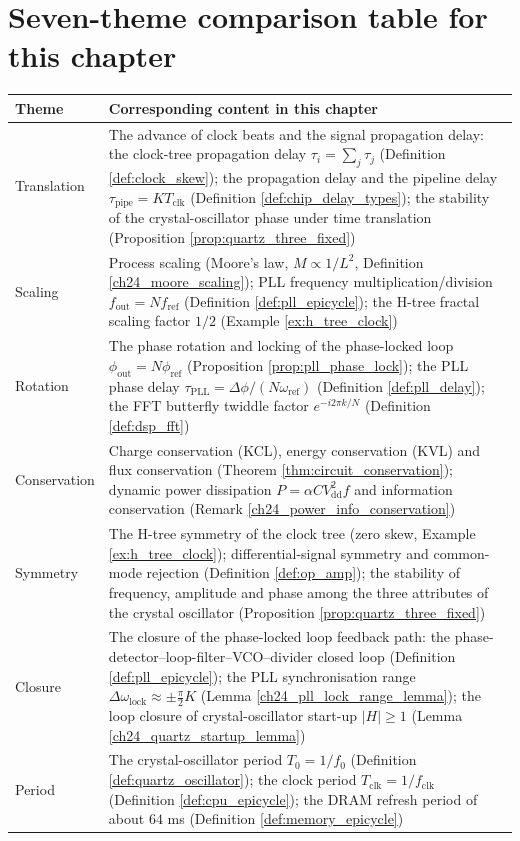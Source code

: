 \section*{Seven-theme comparison table for this chapter}

\begin{center}
\begin{tabular}{>{\centering\arraybackslash}p{2.8cm}>{\centering\arraybackslash}p{9.9cm}}
\toprule
Theme & Corresponding content in this chapter \\
\midrule
Translation & The advance of clock beats and the signal propagation delay: the clock-tree propagation delay $\tau_i = \sum_{j}\tau_j$ (Definition \ref{def:clock_skew}); the propagation delay and the pipeline delay $\tau_{\text{pipe}} = K T_{\text{clk}}$ (Definition \ref{def:chip_delay_types}); the stability of the crystal-oscillator phase under time translation (Proposition \ref{prop:quartz_three_fixed}) \\
Scaling & Process scaling (Moore's law, $M\propto 1/L^2$, Definition \ref{ch24_moore_scaling}); PLL frequency multiplication/division $f_{\text{out}} = N f_{\text{ref}}$ (Definition \ref{def:pll_epicycle}); the H-tree fractal scaling factor $1/2$ (Example \ref{ex:h_tree_clock}) \\
Rotation & The phase rotation and locking of the phase-locked loop $\phi_{\text{out}} = N\phi_{\text{ref}}$ (Proposition \ref{prop:pll_phase_lock}); the PLL phase delay $\tau_{\text{PLL}} = \Delta\phi/(N\omega_{\text{ref}})$ (Definition \ref{def:pll_delay}); the FFT butterfly twiddle factor $e^{-i2\pi k/N}$ (Definition \ref{def:dsp_fft}) \\
Conservation & Charge conservation (KCL), energy conservation (KVL) and flux conservation (Theorem \ref{thm:circuit_conservation}); dynamic power dissipation $P = \alpha C V_{\text{dd}}^2 f$ and information conservation (Remark \ref{ch24_power_info_conservation}) \\
Symmetry & The H-tree symmetry of the clock tree (zero skew, Example \ref{ex:h_tree_clock}); differential-signal symmetry and common-mode rejection (Definition \ref{def:op_amp}); the stability of frequency, amplitude and phase among the three attributes of the crystal oscillator (Proposition \ref{prop:quartz_three_fixed}) \\
Closure & The closure of the phase-locked loop feedback path: the phase-detector--loop-filter--VCO--divider closed loop (Definition \ref{def:pll_epicycle}); the PLL synchronisation range $\Delta\omega_{\text{lock}} \approx \pm\frac{\pi}{2}K$ (Lemma \ref{ch24_pll_lock_range_lemma}); the loop closure of crystal-oscillator start-up $|H|\ge 1$ (Lemma \ref{ch24_quartz_startup_lemma}) \\
Period & The crystal-oscillator period $T_0 = 1/f_0$ (Definition \ref{def:quartz_oscillator}); the clock period $T_{\text{clk}} = 1/f_{\text{clk}}$ (Definition \ref{def:cpu_epicycle}); the DRAM refresh period of about $64$ ms (Definition \ref{def:memory_epicycle}) \\
\bottomrule
\end{tabular}
\end{center}

